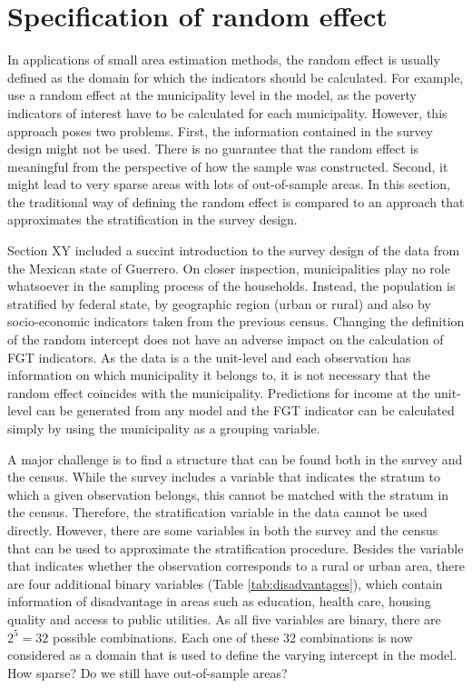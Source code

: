\section{Specification of random effect}
\label{ch:raneff}
In applications of small area estimation methods, the random effect is usually defined as the domain for which the indicators should be calculated.
For example, \cite{rojas_perilla_data_2020} use a random effect at the municipality level in the model, as the poverty indicators of interest have to be calculated for each municipality.
However, this approach poses two problems.
First, the information contained in the survey design might not be used.
There is no guarantee that the random effect is meaningful from the perspective of how the sample was constructed.
Second, it might lead to very sparse areas with lots of out-of-sample areas.
In this section, the traditional way of defining the random effect is compared to an approach that approximates the stratification in the survey design.

Section XY included a succint introduction to the survey design of the data from the Mexican state of Guerrero.
On closer inspection, municipalities play no role whatsoever in the sampling process of the households.
Instead, the population is stratified by federal state, by geographic region (urban or rural) and also by socio-economic indicators taken from the previous census.
Changing the definition of the random intercept does not have an adverse impact on the calculation of FGT indicators.
As the data is a the unit-level and each observation has information on which municipality it belongs to, it is not necessary that the random effect coincides with the municipality.
Predictions for income at the unit-level can be generated from any model and the FGT indicator can be calculated simply by using the municipality as a grouping variable.

A major challenge is to find a structure that can be found both in the survey and the census.
While the survey includes a variable that indicates the stratum to which a given observation belongs, this cannot be matched with the stratum in the census.
Therefore, the stratification variable in the data cannot be used directly.
However, there are some variables in both the survey and the census that can be used to approximate the stratification procedure.
Besides the  variable that indicates whether the observation corresponds to a rural or urban area, there are four additional binary variables (Table \ref{tab:disadvantages}), which contain information of disadvantage in areas such as education, health care, housing quality and access to public utilities.
As all five variables are binary, there are $2^5 = 32$ possible combinations.
Each one of these 32 combinations is now considered as a domain that is used to define the varying intercept in the model.
How sparse? Do we still have out-of-sample areas?

